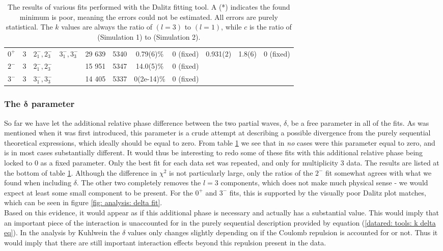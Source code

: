 \begin{landscape}
\begin{table}[]
\begin{tabular}{ccccccccccc}
		$0^+$ & 3 & $2^-_1, 2^-_3$ & $3^-_1, 3^-_3$ & 29 639 & 5340 & 0.79(6)\% & 0 (fixed) & 0.931(2) & 1.8(6) & 0 (fixed) \\
		$2^-$ & 3 & $2^-_1, 2^-_3$ &  & 15 951 & 5347 & 14.0(5)\% & 0 (fixed) &  &  &  \\		
		$3^-$ & 3 & $3^-_1, 3^-_3$ &  & 14 405 & 5337 & 0(2e-14)\% & 0 (fixed) &  &  &  \\
	\end{tabular}
	\caption{The results of various fits performed with the Dalitz fitting tool. A (*) indicates the found minimum is poor, meaning the errors could not be estimated. All errors are purely statistical. The $k$ values are always the ratio of $(l=3)$ to $(l=1)$, while $c$ is the ratio of (Simulation 1) to (Simulation 2).}
	\label{table: analysis: dalitz fit results}
\end{table}
\end{landscape}

\subsubsection{The $\bm{\delta}$ parameter}
So far we have let the additional relative phase difference between the two partial waves, $\delta$, be a free parameter in all of the fits. As was mentioned when it was first introduced, this parameter is a crude attempt at describing a possible divergence from the purely sequential theoretical expressions, which ideally should be equal to zero. From table \ref{table: analysis: dalitz fit results} we see that in \textit{no} cases were this parameter equal to zero, and is in most cases substantially different. It would thus be interesting to redo some of these fits with this additional relative phase being locked to $0$ as a fixed parameter. Only the best fit for each data set was repeated, and only for multiplicity $3$ data. The results are listed at the bottom of table \ref{table: analysis: dalitz fit results}. Although the difference in $\chi^2$ is not particularly large, only the ratios of the $2^-$ fit somewhat agrees with what we found when including $\delta$. The other two completely removes the $l=3$ components, which does not make much physical sense - we would expect at least some small component to be present. For the $0^+$ and $3^-$ fits, this is supported by the visually poor Dalitz plot matches, which can be seen in figure \ref{fig: analysis: delta fit}. \\

Based on this evidence, it would appear as if this additional phase is necessary and actually has a substantial value. This would imply that an important piece of the interaction is unaccounted for in the purely sequential description provided by equation (\ref{datared: tools: k delta eq}). In the analysis by Kuhlwein \cite{Kuhlwein} the $\delta$ values only changes slightly depending on if the Coulomb repulsion is accounted for or not. Thus it would imply that there are still important interaction effects beyond this repulsion present in the data. 

